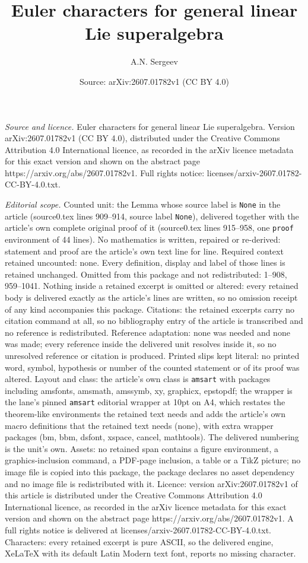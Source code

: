 \documentclass[10pt,a4paper]{amsart}
\title[Euler characters for general linear Lie superalgebra]{Euler characters for general linear Lie superalgebra}
\author{A.N. Sergeev}
\date{Source: arXiv:2607.01782v1 (CC BY 4.0)}
\begin{document}
\maketitle

\noindent\emph{Source and licence.} Euler characters for general linear Lie superalgebra. Version arXiv:2607.01782v1 (CC BY 4.0), distributed under the Creative Commons Attribution 4.0 International licence, as recorded in the arXiv licence metadata for this exact version and shown on the abstract page https://arxiv.org/abs/2607.01782v1. Full rights notice: licenses/arxiv-2607.01782-CC-BY-4.0.txt.\par\smallskip

\noindent\textit{Editorial scope.} Counted unit: the Lemma whose source label is \texttt{None} in the article (source0.tex lines 909--914, source label \texttt{None}), delivered together with the article's own complete original proof of it (source0.tex lines 915--958, one \texttt{proof} environment of 44 lines). No mathematics is written, repaired or re-derived: statement and proof are the article's own text line for line. Required context retained uncounted: none. Every definition, display and label of those lines is retained unchanged. Omitted from this package and not redistributed: 1--908, 959--1041. Nothing inside a retained excerpt is omitted or altered: every retained body is delivered exactly as the article's lines are written, so no omission receipt of any kind accompanies this package. Citations: the retained excerpts carry no citation command at all, so no bibliography entry of the article is transcribed and no reference is redistributed. Reference adaptation: none was needed and none was made; every reference inside the delivered unit resolves inside it, so no unresolved reference or citation is produced. Printed slips kept literal: no printed word, symbol, hypothesis or number of the counted statement or of its proof was altered. Layout and class: the article's own class is \texttt{amsart} with packages including amsfonts, amsmath, amssymb, xy, graphicx, epstopdf; the wrapper is the lane's pinned \texttt{amsart} editorial wrapper at 10pt on A4, which restates the theorem-like environments the retained text needs and adds the article's own macro definitions that the retained text needs (none), with extra wrapper packages (bm, bbm, dsfont, xspace, cancel, mathtools). The delivered numbering is the unit's own. Assets: no retained span contains a figure environment, a graphics-inclusion command, a PDF-page inclusion, a table or a TikZ picture; no image file is copied into this package, the package declares no asset dependency and no image file is redistributed with it. Licence: version arXiv:2607.01782v1 of this article is distributed under the Creative Commons Attribution 4.0 International licence, as recorded in the arXiv licence metadata for this exact version and shown on the abstract page https://arxiv.org/abs/2607.01782v1. A full rights notice is delivered at licenses/arxiv-2607.01782-CC-BY-4.0.txt. Characters: every retained excerpt is pure ASCII, so the delivered engine, XeLaTeX with its default Latin Modern text font, reports no missing character.
\end{document}
